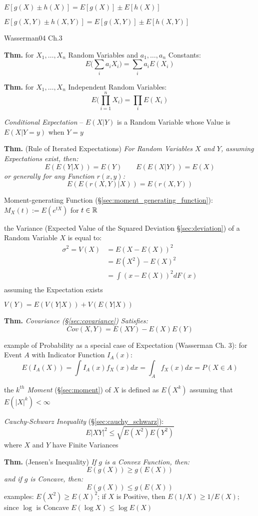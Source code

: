 $E [g(X) \pm h(X)] = E[g(X)] \pm E[h(X)]$

$E [g(X,Y) \pm h(X,Y)] = E[g(X,Y)] \pm E[h(X,Y)]$

Wasserman04 Ch.3

\textbf{Thm.} for $X_1, \ldots, X_n$ Random Variables and $a_1, \ldots, a_n$
Constants:
\[
  E\Big(\sum_i a_i X_i\Big) = \sum_i a_i E(X_i)
\]

\textbf{Thm.} for $X_1, \ldots, X_n$ Independent Random Variables:
\[
  E\Big(\prod_{i=1}^n X_i\Big) = \prod_i E(X_i)
\]

\emph{Conditional Expectation} -- $E(X|Y)$ is a Random Variable whose Value is
$E(X|Y = y)$ when $Y = y$

\textbf{Thm.} (Rule of Iterated Expectations) \emph{
  For Random Variables $X$ and $Y$, assuming Expectations exist, then:
  \[
    E(E(Y|X)) = E(Y) \quad\quad E(E(X|Y)) = E(X)
  \]
  or generally for any Function $r(x,y)$:
  \[
    E(E(r(X,Y)|X)) = E(r(X,Y))
  \]
}

Moment-generating Function (\S\ref{sec:moment_generating_function}):
$M_X(t) := E(e^{tX})$ for $t \in \mathbb{R}$

the Variance (Expected Value of the Squared Deviation \S\ref{sec:deviation}) of
a Random Variable $X$ is equal to:
\begin{align*}
  \sigma^2 = V(X) & = E(X - E(X))^2   \\
                  & = E(X^2) - E(X)^2 \\
                  & = \int(x - E(X))^2 dF(x) \\
\end{align*}
assuming the Expectation exists

$V(Y) = E(V(Y|X)) + V(E(Y|X))$

\textbf{Thm.} \emph{Covariance (\S\ref{sec:covariance}) Satisfies:
  \[
    Cov(X,Y) = E(XY) - E(X)E(Y)
  \]
}

example of Probability as a special case of Expectation (Wasserman Ch. 3): for
Event $A$ with Indicator Function $I_A(x)$:
\[
  E(I_A(X)) = \int I_A(x)f_X(x)dx = \int_A f_X(x) dx = P(X \in A)
\]

the \emph{$k^{th}$ Moment} (\S\ref{sec:moment}) of $X$ is defined as $E(X^k)$
assuming that $E(|X|^k) < \infty$

\emph{Cauchy-Schwarz Inequality} (\S\ref{sec:cauchy_schwarz}):
\[
  E|XY|^2 \leq \sqrt{E(X^2)E(Y^2)}
\]
where $X$ and $Y$ have Finite Variances

\textbf{Thm.} (Jensen's Inequality) \emph{
  If $g$ is a Convex Function, then:
  \[
    E(g(X)) \geq g(E(X))
  \]
  and if $g$ is Concave, then:
  \[
    E(g(X)) \leq g(E(X))
  \]
}
examples: $E(X^2) \geq E(X)^2$; if $X$ is Positive, then $E(1/X) \geq 1/E(X)$;
since $\log$ is Concave $E(\log X) \leq \log E(X)$



